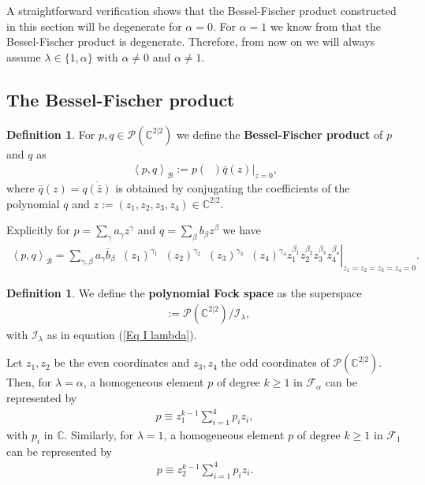 \documentclass{amsart}
\numberwithin{theorem}{section}
\theoremstyle{definition}
\newtheorem{Def}[theorem]{Definition}
\theoremstyle{remark}
\def\C{\mathds{C} }
\DeclareMathOperator{\bessel}{\mathcal B_\lambda}
\DeclareMathOperator{\Fock}{\mc F_\lambda}
\newcommand{\bfip}[1]{\left<{#1}\right>_\mathcal B}
\newcommand{\mc}[1]{\mathcal{#1}}
\begin{document}
A straightforward verification shows that the Bessel-Fischer product constructed in this section will be degenerate for $\alpha=0$. For $\alpha =1$  we know from \cite[Proposition 4.13]{BCD} that  the Bessel-Fischer product is degenerate. Therefore, from now on we will always assume $\lambda\in\{1,\alpha\}$ with $\alpha\not=0$ and $\alpha\not=1$.

\subsection{The Bessel-Fischer product}

\begin{Def}
For $p, q\in \mathcal P(\C^{2|2})$ we define the \textbf{Bessel-Fischer product} of $p$ and $q$ as
\begin{align*}
\bfip{p,q} := \left. p(\bessel)\bar q(z)\right|_{z=0},
\end{align*}
where $\bar q(z) = \overline{q(\bar z)}$ is obtained by conjugating the coefficients of the polynomial $q$ and $z :=(z_1, z_2, z_3, z_4)\in \C^{2|2}$.
\end{Def}

Explicitly for $p=\sum_\gamma a_\gamma z^\gamma$ and $q=\sum_\beta b_\beta z^\beta$ we have
\begin{align*}
\bfip{p,q} = \sum_{\gamma, \beta}\left.a_\gamma \bar b_\beta \bessel(z_1)^{\gamma_1}\bessel(z_2)^{\gamma_{2}}\bessel(z_3)^{\gamma_3}\bessel(z_4)^{\gamma_4}z_1^{\beta_1}z_2^{\beta_2}z_3^{\beta_3}z_4^{\beta_4}\right|_{z_1=z_2=z_3=z_4=0}.
\end{align*}

\begin{Def}\label{DefFock}
We define the \textbf{polynomial Fock space} as the superspace
\begin{align*}
\Fock := \mathcal{P}(\C^{2|2})/ \mc I_\lambda,
\end{align*}
with $\mc I_\lambda$ as in equation (\ref{Eq I lambda}).
\end{Def}

Let $z_1, z_2$ be the even coordinates and $z_3, z_4$ the odd coordinates of $\mathcal{P}(\C^{2|2})$. Then, for $\lambda=\alpha$, a homogeneous element $p$ of degree $k\geq 1$ in $\mathcal{F}_\alpha$ can be represented by 
\begin{align*}
p \equiv z_1^{k-1}\sum_{i=1}^4 p_i z_i, 
\end{align*}
with $p_i$ in $\C$.
Similarly, for $\lambda=1$, a homogeneous element $p$ of degree $k\geq 1$ in $\mathcal{F}_1$ can be represented by 
\begin{align*}
p \equiv z_2^{k-1}\sum_{i=1}^4 p_i z_i.
\end{align*}
\end{document}
